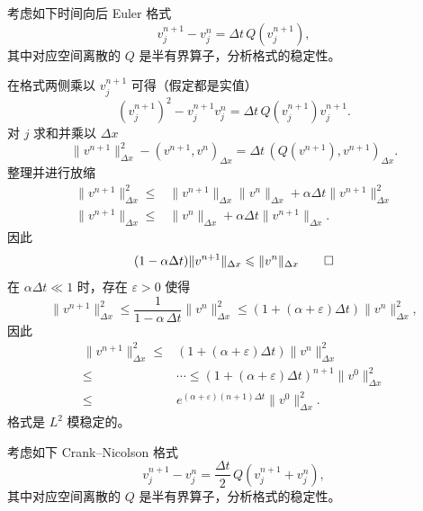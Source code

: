 \begin{example}
    考虑如下时间向后 Euler 格式
    \[
        v_j^{n+1} - v_j^n = \Delta t \,Q(v_j^{n+1}),
    \]
    其中对应空间离散的 $Q$ 是半有界算子，分析格式的稳定性。
\end{example}

\begin{solution*}
    在格式两侧乘以 $v_j^{n+1}$ 可得（假定都是实值）
    \[
        (v_j^{n+1})^2 - v_j^{n+1} v_j^n = \Delta t \,Q(v_j^{n+1}) v_j^{n+1}.
    \]
    对 $j$ 求和并乘以 $\Delta x$
    \[
        \|v^{n+1}\|_{\Delta x}^2 - (v^{n+1},v^{n})_{\Delta x} = \Delta t\, (Q(v^{n+1}),v^{n+1})_{\Delta x}.
    \]
    整理并进行放缩
    \begin{align*}
        \|v^{n+1}\|_{\Delta x}^2 \le{} & \|v^{n+1}\|_{\Delta x} \|v^{n}\|_{\Delta x} + \alpha \Delta t \|v^{n+1}\|_{\Delta x}^2 \\
        \|v^{n+1}\|_{\Delta x} \le{}   & \|v^{n}\|_{\Delta x} + \alpha \Delta t \|v^{n+1}\|_{\Delta x}.
    \end{align*}
    因此
    \[
        (1-\alpha \Delta t) \|v^{n+1}\|_{\Delta x} \le  \|v^{n}\|_{\Delta x}  \qedhere
    \]
    在 $\alpha \Delta t \ll 1$ 时，存在 $\varepsilon > 0$ 使得
    \[
        \|v^{n+1}\|_{\Delta x}^2 \le
        \frac{1}{1-\alpha \, \Delta t} \|v^{n}\|_{\Delta x}^2
        \le (1 + (\alpha +\varepsilon) \Delta t) \|v^{n}\|_{\Delta x}^2,
    \]
    因此
    \begin{align*}
        \|v^{n+1}\|_{\Delta x}^2 \le{} & (1 + (\alpha+\varepsilon) \Delta t) \|v^{n}\|_{\Delta x}^2                  \\
        \le{}                          & \cdots \le (1 + (\alpha+\varepsilon) \Delta t)^{n+1} \|v^{0}\|_{\Delta x}^2 \\
        \le{}                          & e^{(\alpha+\varepsilon) (n+1)\Delta t} \|v^{0}\|_{\Delta x}^2.
    \end{align*}
    格式是 $L^2$ 模稳定的。
\end{solution*}

\begin{example}
    考虑如下 Crank–Nicolson 格式
    \[
        v_j^{n+1} - v_j^n = \frac{\Delta t}2 \,Q(v_j^{n+1} + v_j^n),
    \]
    其中对应空间离散的 $Q$ 是半有界算子，分析格式的稳定性。
\end{example}


